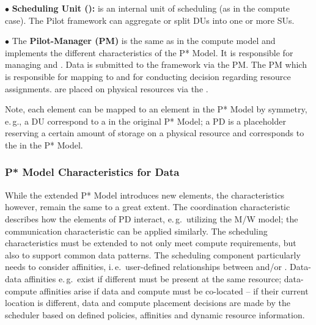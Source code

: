 \documentclass[conference]{IEEEtran}
\begin{document}
\noindent$\bullet$
  \textbf{Scheduling Unit (\su):} is an internal unit of scheduling (as in 
  the compute case). The Pilot framework can aggregate or split DUs into one 
  or more SUs.

\noindent$\bullet$ 
  The \textbf{Pilot-Manager (PM)} is the same as in the compute model and
  implements the different characteristics of the P* Model. It is responsible for
  managing \dus and \sus. Data is submitted to the framework via the PM. The PM
  which is responsible for mapping \dus to \sus and for conducting decision 
  regarding resource assignments. \sus are placed on physical resources via the \pilot.

Note, each element can be mapped to an element in the P* Model by
symmetry, e.\,g., a DU correspond to a \cu  in the original P* Model; 
a PD is a placeholder reserving a certain amount of storage on a physical 
resource and corresponds to the \pilot in the P* Model.



\subsubsection*{P* Model Characteristics for Data}

While the extended P* Model introduces new elements, the
characteristics however, remain the same to a great extent. The
coordination characteristic describes how the elements of PD interact,
e.\,g.\ utilizing the M/W model; the communication characteristic can
be applied similarly. The scheduling characteristics must be extended
to not only meet compute requirements, but also to support common data
patterns. The scheduling component particularly needs to consider
affinities, i.\,e.\ user-defined relationships between \cus and/or
\dus. Data-data affinities e.\,g.\ exist if different \dus must be
present at the same resource; data-compute affinities arise if
data and compute must be co-located -- if their
current location is different, data and compute placement decisions
are made by the scheduler based on defined policies, affinities and
dynamic resource information.
\end{document}
